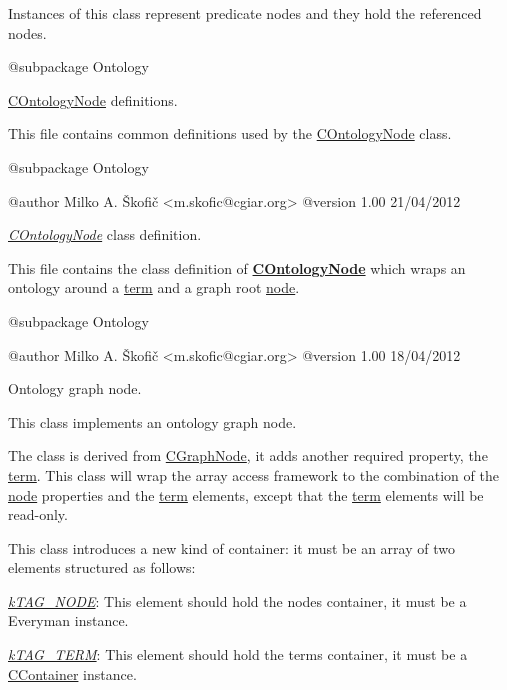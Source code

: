 Instances of this class represent predicate nodes and they hold the referenced nodes.

\begin{DoxyVerb}    @subpackage     Ontology\end{DoxyVerb}


\hyperlink{class_c_ontology_node}{C\-Ontology\-Node} definitions.

This file contains common definitions used by the \hyperlink{class_c_ontology_node}{C\-Ontology\-Node} class.

\begin{DoxyVerb}    @subpackage     Ontology

    @author         Milko A. Škofič <m.skofic@cgiar.org>
    @version        1.00 21/04/2012\end{DoxyVerb}


{\itshape \hyperlink{class_c_ontology_node}{C\-Ontology\-Node}} class definition.

This file contains the class definition of {\bfseries \hyperlink{class_c_ontology_node}{C\-Ontology\-Node}} which wraps an ontology around a \hyperlink{class_c_ontology_term}{term} and a graph root \hyperlink{class_c_graph_node}{node}.

\begin{DoxyVerb}    @subpackage     Ontology

    @author         Milko A. Škofič <m.skofic@cgiar.org>
    @version        1.00 18/04/2012\end{DoxyVerb}


Ontology graph node.

This class implements an ontology graph node.

The class is derived from \hyperlink{class_c_graph_node}{C\-Graph\-Node}, it adds another required property, the \hyperlink{}{term}. This class will wrap the array access framework to the combination of the \hyperlink{}{node} properties and the \hyperlink{}{term} elements, except that the \hyperlink{}{term} elements will be read-\/only.

This class introduces a new kind of container\-: it must be an array of two elements structured as follows\-:


\begin{DoxyItemize}
\item {\itshape \hyperlink{}{k\-T\-A\-G\-\_\-\-N\-O\-D\-E}}\-: This element should hold the nodes container, it must be a Everyman instance. 
\item {\itshape \hyperlink{}{k\-T\-A\-G\-\_\-\-T\-E\-R\-M}}\-: This element should hold the terms container, it must be a \hyperlink{class_c_container}{C\-Container} instance. 
\end{DoxyItemize}

